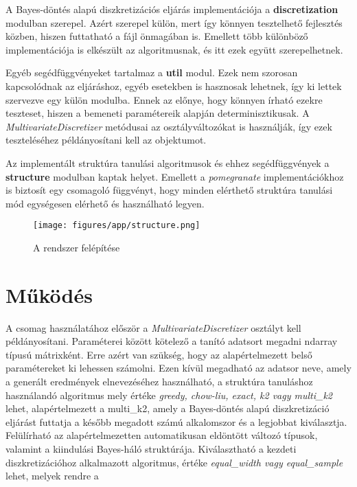 A Bayes-döntés alapú diszkretizációs eljárás implementációja a \textbf{discretization} modulban szerepel. Azért szerepel külön, mert így könnyen tesztelhető fejlesztés közben, hiszen futtatható a fájl önmagában is. Emellett több különböző implementációja is elkészült az algoritmusnak, és itt ezek együtt szerepelhetnek.

Egyéb segédfüggvényeket tartalmaz a \textbf{util} modul. Ezek nem szorosan kapcsolódnak az eljáráshoz, egyéb esetekben is hasznosak lehetnek, így ki lettek szervezve egy külön modulba. Ennek az előnye, hogy könnyen írható ezekre teszteset, hiszen a bemeneti paramétereik alapján determinisztikusak. A \textit{MultivariateDiscretizer} metódusai az osztályváltozókat is használják, így ezek teszteléséhez példányosítani kell az objektumot.

Az implementált struktúra tanulási algoritmusok és ehhez segédfüggvények a \textbf{structure} modulban kaptak helyet. Emellett a \emph{pomegranate} implementációkhoz is biztosít egy csomagoló függvényt, hogy minden elérthető struktúra tanulási mód egységesen elérhető és használható legyen.

\begin{figure}[htp]
    \centering
    \texttt{[image: figures/app/structure.png]}
    \caption{A rendszer felépítése}
    \label{fig:struktura-diagram}
\end{figure}


\section{Működés}
A csomag használatához először a \emph{MultivariateDiscretizer} osztályt kell példányosítani. Paraméterei között kötelező a tanító adatsort megadni ndarray típusú mátrixként. Erre azért van szükség, hogy az alapértelmezett belső paramétereket ki lehessen számolni. Ezen kívül megadható az adatsor neve, amely a generált eredmények elnevezéséhez használható, a struktúra tanuláshoz használandó algoritmus mely értéke \emph{greedy, chow-liu, exact, k2 vagy multi\_k2} lehet, alapértelmezett a multi\_k2, amely a Bayes-döntés alapú diszkretizáció eljárást futtatja a később megadott számú alkalomszor és a legjobbat kiválasztja. Felülírható az alapértelmezetten automatikusan eldöntött változó típusok, valamint a kiindulási Bayes-háló struktúrája. Kiválasztható a kezdeti diszkretizációhoz alkalmazott algoritmus, értéke \emph{equal\_width vagy equal\_sample} lehet, melyek rendre a